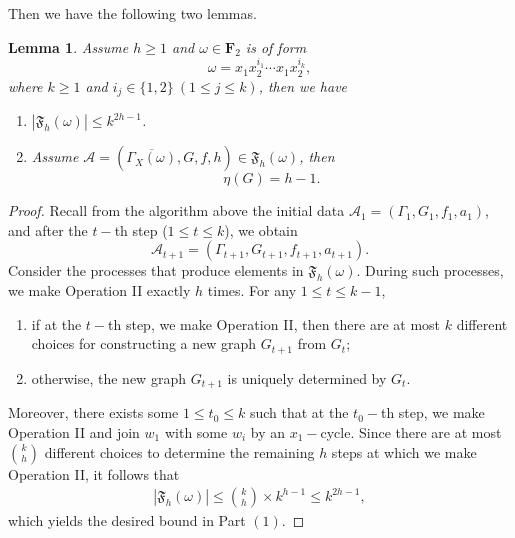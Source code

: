 \documentclass{amsart}
\theoremstyle{plain}
\newtheorem{lemma}[theorem]{Lemma}
\theoremstyle{definition}
\theoremstyle{remark}
\begin{document}
Then we have the following two lemmas.
\begin{lemma}\label{l-eta}
Assume $h\geq 1$ and $\omega\in\textbf{F}_2$ is of form
$$\omega=x_1x_2^{i_1}\cdots x_1x_2^{i_k},$$
where $k\geq 1$ and $i_j\in\{1,2\}\ (1\leq j\leq k)$, then we have
\begin{enumerate}
    \item  $|\mathfrak{F}_h(\omega)|\leq k^{2h-1}$. \vspace{5pt}
    \item Assume $\mathcal{A}=\left(\overline{\Gamma_X(\omega)},G,f,h\right)\in\mathfrak{F}_h(\omega)$, then $$\eta(G)= h-1.$$
\end{enumerate}
\end{lemma}
\begin{proof}
     Recall from the algorithm above the initial data $\mathcal{A}_1=(\Gamma_1,G_1,f_1,a_1)$, and after the $t-$th step ($1\leq t\leq k$), we obtain $$\mathcal{A}_{t+1}=(\Gamma_{t+1},G_{t+1},f_{t+1},a_{t+1}).$$
     Consider the processes that produce elements in $\mathfrak{F}_h(\omega)$. During such processes, we make Operation II exactly $h$ times. For any $1\leq t\leq k-1$, 
     \begin{enumerate}
         \item if at the $t-$th step, we make Operation II, then there are at most $k$ different choices for constructing a new graph $G_{t+1}$ from $G_{t}$;
         \item otherwise, the new graph $G_{t+1}$ is uniquely determined by $G_t$.
     \end{enumerate}
      Moreover, there exists some $1\leq t_0\leq k$ such that at the $t_0-$th step, we make Operation II and join $w_1$ with some $w_i$ by an $x_1-$cycle. Since there are at most $\binom{k}{h}$ different choices to determine the remaining $h$ steps at which we make Operation II, it follows that
     \begin{align*}
    |\mathfrak{F}_h(\omega)|\leq \binom{k}{h}\times k^{h-1}\leq k^{2h-1},
     \end{align*}
     which yields the desired bound in Part $(1)$.
     

\end{proof}
\end{document}

